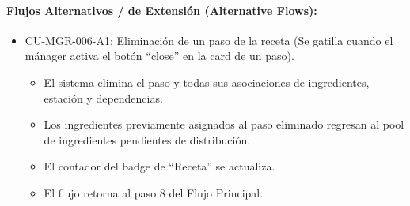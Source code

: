 \paragraph{Flujos Alternativos / de Extensión (Alternative Flows):}
\begin{itemize}
    \item CU-MGR-006-A1: Eliminación de un paso de la receta (Se gatilla cuando el mánager activa el botón ``close'' en la card de un paso).
    \begin{itemize}
        \item El sistema elimina el paso y todas sus asociaciones de ingredientes, estación y dependencias.
        \item Los ingredientes previamente asignados al paso eliminado regresan al pool de ingredientes pendientes de distribución.
        \item El contador del badge de ``Receta'' se actualiza.
        \item El flujo retorna al paso 8 del Flujo Principal.
    \end{itemize}
\end{itemize}

